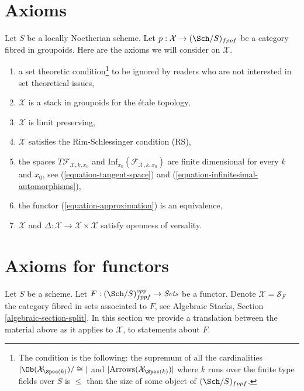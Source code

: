 \section{Axioms}
\label{section-axioms}

\noindent
Let $S$ be a locally Noetherian scheme. Let
$p : \mathcal{X} \to (\Sch/S)_{fppf}$ be a category fibred in groupoids.
Here are the axioms we will consider on $\mathcal{X}$.
\begin{enumerate}
\item[{[-1]}] a set theoretic condition\footnote{The condition is the
following: the supremum of all the cardinalities
$|\Ob(\mathcal{X}_{\Spec(k)})/\cong|$ and
$|\text{Arrows}(\mathcal{X}_{\Spec(k)})|$ where $k$ runs over the finite
type fields over $S$ is $\leq$ than the size of some
object of $(\Sch/S)_{fppf}$.} to be ignored by
readers who are not interested in set theoretical issues,
\item[{[0]}] $\mathcal{X}$ is a stack in groupoids for the \'etale topology,
\item[{[1]}] $\mathcal{X}$ is limit preserving,
\item[{[2]}] $\mathcal{X}$ satisfies the Rim-Schlessinger condition (RS),
\item[{[3]}] the spaces $T\mathcal{F}_{\mathcal{X}, k, x_0}$ and
$\text{Inf}_{x_0}(\mathcal{F}_{\mathcal{X}, k, x_0})$
are finite dimensional
for every $k$ and $x_0$, see
(\ref{equation-tangent-space}) and
(\ref{equation-infinitesimal-automorphisms}),
\item[{[4]}] the functor (\ref{equation-approximation}) is an equivalence,
\item[{[5]}] $\mathcal{X}$ and
$\Delta : \mathcal{X} \to \mathcal{X} \times \mathcal{X}$ satisfy
openness of versality.
\end{enumerate}










\section{Axioms for functors}
\label{section-axioms-functors}

\noindent
Let $S$ be a scheme. Let $F : (\Sch/S)_{fppf}^{opp} \to \textit{Sets}$ be a
functor. Denote $\mathcal{X} = \mathcal{S}_F$ the category fibred in sets
associated to $F$, see Algebraic Stacks, Section \ref{algebraic-section-split}.
In this section we provide a translation between the material above
as it applies to $\mathcal{X}$, to statements about $F$.

